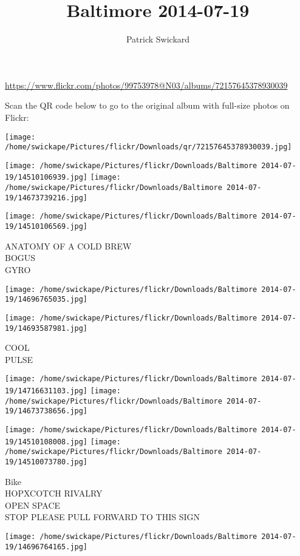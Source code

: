 \documentclass[10pt,letterpaper]{article}
\title{Baltimore 2014-07-19}
\author{Patrick Swickard}
\date{}
\begin{document}
\maketitle

\url{https://www.flickr.com/photos/99753978@N03/albums/72157645378930039}

Scan the QR code below to go to the original album with full-size photos on Flickr:

\texttt{[image: /home/swickape/Pictures/flickr/Downloads/qr/72157645378930039.jpg]}
\pagebreak

\texttt{[image: /home/swickape/Pictures/flickr/Downloads/Baltimore 2014-07-19/14510106939.jpg]}
\texttt{[image: /home/swickape/Pictures/flickr/Downloads/Baltimore 2014-07-19/14673739216.jpg]}

\vspace{0.25in}
\texttt{[image: /home/swickape/Pictures/flickr/Downloads/Baltimore 2014-07-19/14510106569.jpg]}

ANATOMY OF A COLD BREW\\
BOGUS\\
GYRO
\pagebreak

\texttt{[image: /home/swickape/Pictures/flickr/Downloads/Baltimore 2014-07-19/14696765035.jpg]}

\vspace{0.25in}
\texttt{[image: /home/swickape/Pictures/flickr/Downloads/Baltimore 2014-07-19/14693587981.jpg]}

COOL\\
PULSE
\pagebreak

\texttt{[image: /home/swickape/Pictures/flickr/Downloads/Baltimore 2014-07-19/14716631103.jpg]}
\texttt{[image: /home/swickape/Pictures/flickr/Downloads/Baltimore 2014-07-19/14673738656.jpg]}

\texttt{[image: /home/swickape/Pictures/flickr/Downloads/Baltimore 2014-07-19/14510108008.jpg]}
\texttt{[image: /home/swickape/Pictures/flickr/Downloads/Baltimore 2014-07-19/14510073780.jpg]}

Bike\\
HOPXCOTCH RIVALRY\\
OPEN SPACE\\
STOP PLEASE PULL FORWARD TO THIS SIGN
\pagebreak

\texttt{[image: /home/swickape/Pictures/flickr/Downloads/Baltimore 2014-07-19/14696764165.jpg]}
\end{document}
